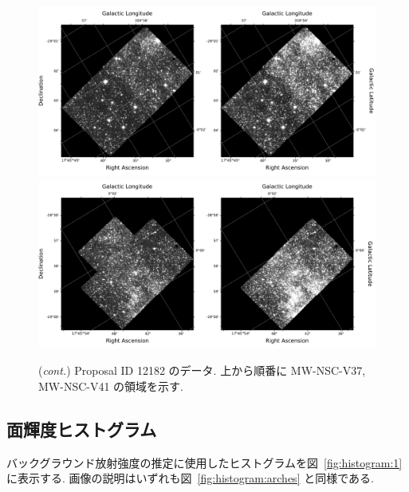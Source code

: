 \documentclass[10pt,a4paper,dvipdfmx,uplatex]{jsarticle}
\begin{document}
\addtocounter{figure}{-1}
\begin{figure}
  \centering
  \includegraphics[width=\linewidth]{img/hst_12182_a6_wfc3_ir_f127m_drz.pdf}
  \includegraphics[width=\linewidth]{img/hst_12182_a7_wfc3_ir_f127m_drz.pdf}
  \caption{(\textit{cont.}) Proposal ID 12182 のデータ. 上から順番に MW-NSC-V37, MW-NSC-V41 の領域を示す.}
  \label{fig:12182b}
\end{figure}

\subsection{面輝度ヒストグラム}
バックグラウンド放射強度の推定に使用したヒストグラムを図~\ref{fig:histogram:1} に表示する. 画像の説明はいずれも図~\ref{fig:histogram:arches} と同様である.
\end{document}
